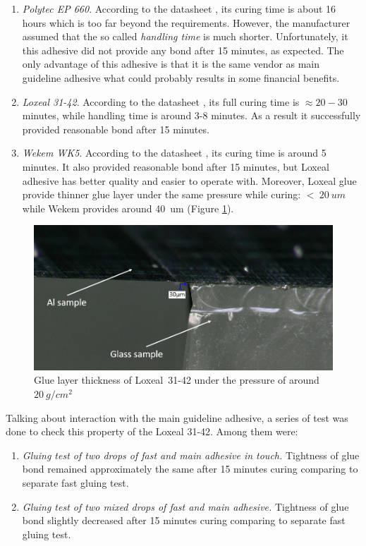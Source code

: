\begin{enumerate}
\setlength\itemsep{-0.5em}
\item \textit{Polytec EP 660}. According to the datasheet \cite{Polytec_EP_660_datasheet}, its curing time is about 16 hours which is too far beyond the requirements. However, the manufacturer assumed that the so called \emph{handling time} is much shorter. Unfortunately, it this adhesive did not provide any bond after 15 minutes, as expected. The only advantage of this adhesive is that it is the same vendor as main guideline adhesive what could probably results in some financial benefits.
\item \textit{Loxeal 31-42}. According to the datasheet \cite{Loxeal_31_42_datasheet}, its full curing time is $\approx20-30$~ minutes, while handling time is around 3-8 minutes. As a result it successfully provided reasonable bond after 15 minutes.
\item \textit{Wekem WK5}. According to the datasheet \cite{Wekem_WK_5_datasheet}, its curing time is around 5 minutes. It also provided reasonable bond after 15 minutes, but Loxeal adhesive has better quality and easier to operate with. Moreover, Loxeal glue provide thinner glue layer under the same pressure while curing: $<~20~um$ while Wekem provides around 40~um (Figure \ref{fig:glue_thickness}).
\end{enumerate}

\begin{figure}[ht]\centering
\includegraphics[width=0.7\linewidth]{Data/Module_assembly/Loxeal_393g_point_1.png}
\caption{Glue layer thickness of Loxeal~31-42 under the pressure of around $20~g/cm^{2}$}
\label{fig:glue_thickness}
\end{figure}

Talking about interaction with the main guideline adhesive, a series of test was done to check this property of the Loxeal 31-42. Among them were:

\begin{enumerate}
\setlength\itemsep{-0.5em}
\item \textit{Gluing test of two drops of fast and main adhesive in touch.} Tightness of glue bond remained approximately the same after 15 minutes curing comparing to separate fast gluing test.
\item \textit{Gluing test of two mixed drops of fast and main adhesive.} Tightness of glue bond slightly decreased after 15 minutes curing comparing to separate fast gluing test.
\end{enumerate}

